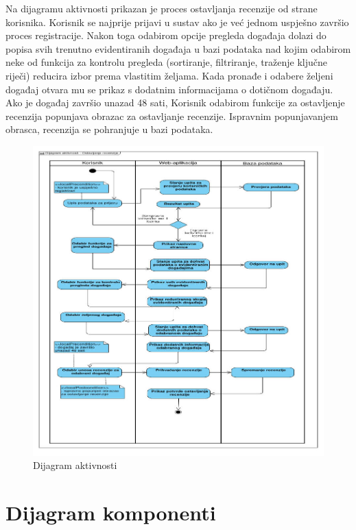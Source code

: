 			 Na dijagramu aktivnosti prikazan je proces ostavljanja recenzije od strane korisnika. Korisnik se najprije prijavi u sustav ako je već jednom uspješno završio proces registracije. Nakon toga odabirom opcije pregleda događaja dolazi do popisa svih trenutno evidentiranih događaja u bazi podataka nad kojim odabirom neke od funkcija za kontrolu pregleda (sortiranje, filtriranje, traženje ključne riječi) reducira izbor prema vlastitim željama. Kada pronađe i odabere željeni događaj otvara mu se prikaz s dodatnim informacijama o dotičnom događaju. Ako je događaj završio unazad 48 sati, Korisnik odabirom funkcije za ostavljenje recenzija popunjava obrazac za ostavljanje recenzije. Ispravnim popunjavanjem obrasca, recenzija se pohranjuje u bazi podataka.  
			 \begin{figure}[htbp]
				\centering
				\includegraphics[width=1\textwidth]{dijagrami/diagram_aktivnosti_finally.jpeg} %
				\caption{Dijagram aktivnosti}
			\label{fig:my_image}
			\end{figure}

			\eject
		\section{Dijagram komponenti}
		
